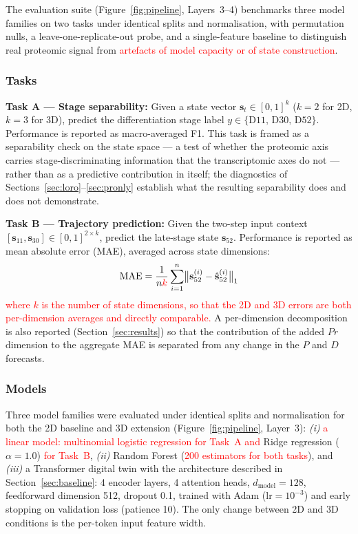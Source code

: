 \documentclass[5p,times,twocolumn]{elsarticle}
\newcommand{\rtag}[1]{}
\newcommand{\rev}[2]{\rtag{#1}\textcolor{red}{#2}}
\newcommand{\lang}[1]{\textcolor{red}{#1}}
\begin{document}
The evaluation suite (Figure~\ref{fig:pipeline}, Layers~3--4)
benchmarks three model families on two tasks under identical
splits and normalisation, with permutation nulls, a
leave-one-replicate-out probe, and a single-feature baseline
to distinguish real proteomic signal from \lang{artefacts of
  model capacity or of state construction}.

\subsubsection{Tasks}

\textbf{Task A --- Stage separability:}
Given a state vector $\mathbf{s}_{t} \in [0,1]^{k}$
($k = 2$ for 2D, $k = 3$ for 3D), predict the differentiation
stage label $y \in \{\text{D11, D30, D52}\}$.
Performance is reported as macro-averaged F1.
This task is framed as a separability check on the state
space --- a test of whether the proteomic axis carries
stage-discriminating information that the transcriptomic
axes do not --- rather than as a predictive contribution in
itself; the diagnostics of
Sections~\ref{sec:loro}--\ref{sec:pronly} establish what the
resulting separability does and does not demonstrate.

\textbf{Task B --- Trajectory prediction:}
Given the two-step input context
$[\mathbf{s}_{11}, \mathbf{s}_{30}] \in [0,1]^{2 \times k}$,
predict the late-stage state $\mathbf{s}_{52}$.
Performance is reported as mean absolute error (MAE),
averaged across state dimensions:
%
\begin{equation}
  \text{MAE} =
    \frac{1}{n\textcolor{red}{k}}
    \sum_{i=1}^{n}
    \bigl\lVert \mathbf{s}^{(i)}_{52} -
                \hat{\mathbf{s}}^{(i)}_{52} \bigr\rVert_{1}
  \label{eq:mae}
\end{equation}
\rev{AC}{where $k$ is the number of state dimensions, so that
  the 2D and 3D errors are both per-dimension averages and
  directly comparable.}
%
A per-dimension decomposition is also reported
(Section~\ref{sec:results}) so that the contribution of the
added $Pr$ dimension to the aggregate MAE is separated from
any change in the $P$ and $D$ forecasts.

\subsubsection{Models}

Three model families were evaluated under identical splits
and normalisation for both the 2D baseline and 3D extension
(Figure~\ref{fig:pipeline}, Layer~3):
\textit{(i)} \rev{AC}{a linear model: multinomial logistic
  regression for Task~A and} Ridge regression ($\alpha = 1.0$)
\rev{AC}{for Task~B},
\textit{(ii)} Random Forest (\rev{AC}{200 estimators for both
  tasks}), and
\textit{(iii)} a Transformer digital twin with the
architecture described in Section~\ref{sec:baseline}:
4 encoder layers, 4 attention heads,
$d_{\text{model}} = 128$, feedforward dimension 512,
dropout 0.1, trained with Adam ($\text{lr} = 10^{-3}$)
and early stopping on validation loss (patience 10).
The only change between 2D and 3D conditions is the
per-token input feature width.
\end{document}

